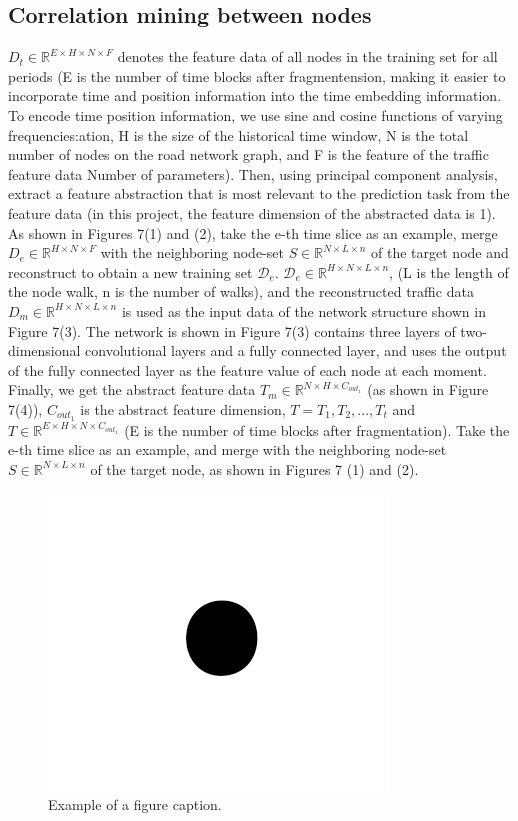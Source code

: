\documentclass[conference]{IEEEtran}
\begin{document}
\subsection{Correlation mining between nodes}
$D_t \in \mathbb{R} ^{E \times H \times N \times F}$ denotes the feature data of all nodes in the training set for all periods (E is the number of time blocks after fragmentension, making it easier to incorporate time and position information into the time embedding information. To encode time position information, we use sine and cosine functions of varying frequencies:ation, H is the size of the historical time window, N is the total number of nodes on the road network graph, and F is the feature of the traffic feature data Number of parameters). Then, using principal component analysis, extract a feature abstraction that is most relevant to the prediction task from the feature data (in this project, the feature dimension of the abstracted data is 1). As shown in Figures 7(1) and (2), take the e-th time slice as an example, merge $D_e \in \mathbb{R} ^{H \times N \times F}$ with the neighboring node-set $S \in \mathbb{R} ^ {N \times L \times n}$ of the target node and reconstruct to obtain a new training set $\mathcal{D}_e$. $\mathcal{D}_e \in \mathbb{R} ^{H \times N \times L \times n}$, (L is the length of the node walk, n is the number of walks), and the reconstructed traffic data $D_m \in \mathbb{R} ^ {H \times N \times L \times n}$ is used as the input data of the network structure shown in Figure 7(3). The network is shown in Figure 7(3) contains three layers of two-dimensional convolutional layers and a fully connected layer, and uses the output of the fully connected layer as the feature value of each node at each moment. Finally, we get the abstract feature data $T_m \in \mathbb{R} ^{N \times H \times C_{out_1}}$ (as shown in Figure 7(4)), $C_{out_1}$ is the abstract feature dimension, $T = {T_1,T_2,... ,T_t}$ and $T \in \mathbb{R} ^ {E \times H \times N \times C_{out_1}}$ (E is the number of time blocks after fragmentation).
Take the e-th time slice as an example, and merge with the neighboring node-set $S \in \mathbb{R} ^ {N \times L \times n}$ of the target node, as shown in Figures 7 (1) and (2).

\begin{figure}[htbp]
    \centerline{\includegraphics{fig1.png}}
    \caption{Example of a figure caption.}
    \label{fig}
\end{figure}
\end{document}
